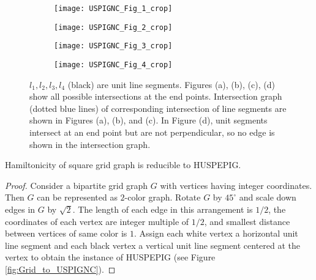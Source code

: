 \begin{figure}[ht!]
  \centering
  \begin{subfigure}[t]{2in}
    \centering
    \texttt{[image: USPIGNC\_Fig\_1\_crop]}
    \caption{\label{fig:USPIGNC_grapha}}
  \end{subfigure}
  \quad\quad
  \begin{subfigure}[t]{2in}
    \centering
    \texttt{[image: USPIGNC\_Fig\_2\_crop]}
    \caption{\label{fig:USPIGNC_graphb}}
  \end{subfigure}	
  \begin{subfigure}[t]{2in}
    \centering
    \vspace*{-1.4in}
    \texttt{[image: USPIGNC\_Fig\_3\_crop]}
    \vspace*{0.4in}
    \caption{\label{fig:USPIGNC_graphc}}
  \end{subfigure}
  \begin{subfigure}[t]{2in}
    \centering
    \texttt{[image: USPIGNC\_Fig\_4\_crop]}
    \caption{\label{fig:USPIGNC_graphd}}
  \end{subfigure}
  \caption{\label{fig:USPIGNC_graph} $l_1, l_2, l_3, l_4$ (black) are unit line segments.
    Figures (a), (b), (c), (d) show all possible intersections at the end points.
    Intersection graph (dotted blue lines) of corresponding  intersection of line segments are shown in Figures (a), (b), and (c).
    In Figure (d), unit segments intersect at an end point but are not perpendicular, so no edge is shown in the intersection graph.}
\end{figure}


\begin{lem} 
  Hamiltonicity of square grid graph is reducible to HUSPEPIG.	
\end{lem}

\begin{proof}
  Consider a bipartite grid graph $G$ with vertices having integer coordinates.
  Then $G$ can be represented as $2$-color graph.
  Rotate $G$ by $45^{\circ}$ and scale down edges in $G$ by $\sqrt{2}$.
  The length of each edge in this arrangement is $1/2$, the coordinates of each vertex are integer multiple of $1/2$, and smallest distance between vertices of same color is $1$.
  Assign each white vertex a horizontal unit line segment and each black vertex a vertical unit line segment centered at the vertex to obtain the instance of HUSPEPIG (see Figure \ref{fig:Grid_to_USPIGNC}).
\end{proof}

